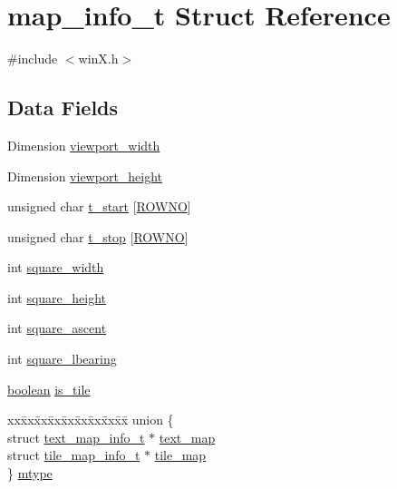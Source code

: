 \hypertarget{structmap__info__t}{\section{map\+\_\+info\+\_\+t Struct Reference}
\label{structmap__info__t}
}


{\ttfamily \#include $<$win\+X.\+h$>$}

\subsection*{Data Fields}
\begin{DoxyCompactItemize}
\item 
Dimension \hyperlink{structmap__info__t_a7bfa57571a4fbddbcb6514b23e1cf186}{viewport\+\_\+width}
\item 
Dimension \hyperlink{structmap__info__t_a0a0556414a1dfe75a986264538d66632}{viewport\+\_\+height}
\item 
unsigned char \hyperlink{structmap__info__t_a06005b4fcfad49d4b5ac9f9877d58e43}{t\+\_\+start} \mbox{[}\hyperlink{gnmap_8c_a9cce134868d97b23c35bcf1ff4a343d8}{R\+O\+W\+N\+O}\mbox{]}
\item 
unsigned char \hyperlink{structmap__info__t_a9f9afbc4cf9ed122146ad91f9589379d}{t\+\_\+stop} \mbox{[}\hyperlink{gnmap_8c_a9cce134868d97b23c35bcf1ff4a343d8}{R\+O\+W\+N\+O}\mbox{]}
\item 
int \hyperlink{structmap__info__t_accdbb100815331534a3031f186eac852}{square\+\_\+width}
\item 
int \hyperlink{structmap__info__t_afa20d151bdcd5b1c5951fffcbf41888f}{square\+\_\+height}
\item 
int \hyperlink{structmap__info__t_a9275412eabdcb189618c01314406b1ad}{square\+\_\+ascent}
\item 
int \hyperlink{structmap__info__t_a6e4474b98d61592c9a57f3316d196d33}{square\+\_\+lbearing}
\item 
\hyperlink{global_8h_a531b10dd351aa162d7dcccd1966308b8}{boolean} \hyperlink{structmap__info__t_a2e6326b9aa9caa2d1663125c45966979}{is\+\_\+tile}
\item 
\begin{tabbing}
xx\=xx\=xx\=xx\=xx\=xx\=xx\=xx\=xx\=\kill
union \{\\
\>struct \hyperlink{structtext__map__info__t}{text\_map\_info\_t} $\ast$ \hyperlink{structmap__info__t_a74f1e3443b492803837c6b2f56d65fd6}{text\_map}\\
\>struct \hyperlink{structtile__map__info__t}{tile\_map\_info\_t} $\ast$ \hyperlink{structmap__info__t_ad3a25f3b733498af77bc597a2d4edb17}{tile\_map}\\
\} \hyperlink{structmap__info__t_a3166d09951aa9aecbcd6d1ee2d6d32fb}{mtype}\\

\end{tabbing}\end{DoxyCompactItemize}



